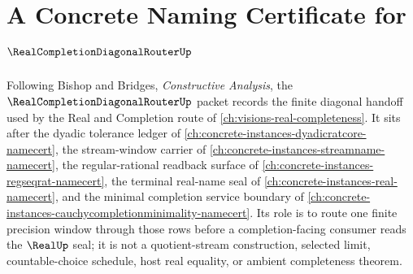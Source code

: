 \chapter{A Concrete Naming Certificate for $\RealCompletionDiagonalRouterUp$}
\label{ch:concrete-instances-real-completion-diagonal-router-namecert}

Following Bishop and Bridges, \emph{Constructive Analysis}, the $\RealCompletionDiagonalRouterUp$ packet records the finite diagonal handoff used by the Real and Completion route of \autoref{ch:visions-real-completeness}. It sits after the dyadic tolerance ledger of \autoref{ch:concrete-instances-dyadicratcore-namecert}, the stream-window carrier of \autoref{ch:concrete-instances-streamname-namecert}, the regular-rational readback surface of \autoref{ch:concrete-instances-regseqrat-namecert}, the terminal real-name seal of \autoref{ch:concrete-instances-real-namecert}, and the minimal completion service boundary of \autoref{ch:concrete-instances-cauchycompletionminimality-namecert}. Its role is to route one finite precision window through those rows before a completion-facing consumer reads the $\RealUp$ seal; it is not a quotient-stream construction, selected limit, countable-choice schedule, host real equality, or ambient completeness theorem.

